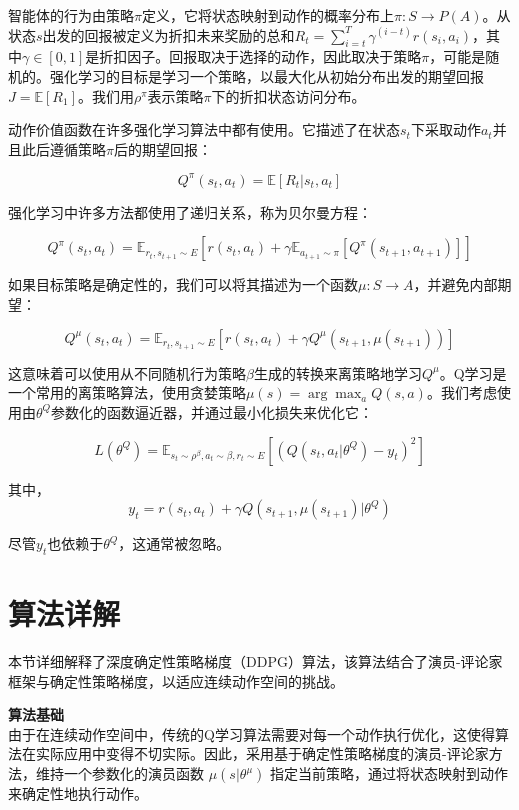 \documentclass[twocolumn, 10pt]{article} %
\theoremstyle{remark}
\begin{document}
智能体的行为由策略$\pi$定义，它将状态映射到动作的概率分布上$\pi : S \to P(A)$。从状态$s$出发的回报被定义为折扣未来奖励的总和$R_t = \sum_{i=t}^T \gamma^{(i-t)} r(s_i, a_i)$，其中$\gamma \in [0, 1]$是折扣因子。回报取决于选择的动作，因此取决于策略$\pi$，可能是随机的。强化学习的目标是学习一个策略，以最大化从初始分布出发的期望回报$J = \mathbb{E}[R_1]$。我们用$\rho^\pi$表示策略$\pi$下的折扣状态访问分布。

动作价值函数在许多强化学习算法中都有使用。它描述了在状态$s_t$下采取动作$a_t$并且此后遵循策略$\pi$后的期望回报：

\[
Q^\pi(s_t, a_t) = \mathbb{E}[R_t | s_t, a_t] 
\]

强化学习中许多方法都使用了递归关系，称为贝尔曼方程：

\[
Q^\pi(s_t, a_t) = \mathbb{E}_{r_t, s_{t+1} \sim E}\left[ r(s_t, a_t) + \gamma \mathbb{E}_{a_{t+1} \sim \pi} [Q^\pi(s_{t+1}, a_{t+1})] \right] 
\]

如果目标策略是确定性的，我们可以将其描述为一个函数$\mu : S \to A$，并避免内部期望：

\[
Q^\mu(s_t, a_t) = \mathbb{E}_{r_t, s_{t+1} \sim E} \left[ r(s_t, a_t) + \gamma Q^\mu(s_{t+1}, \mu(s_{t+1})) \right] 
\]

这意味着可以使用从不同随机行为策略$\beta$生成的转换来离策略地学习$Q^\mu$。Q学习是一个常用的离策略算法，使用贪婪策略$\mu(s) = \arg\max_a Q(s, a)$。我们考虑使用由$\theta^Q$参数化的函数逼近器，并通过最小化损失来优化它：

\[
L(\theta^Q) = \mathbb{E}_{s_t \sim \rho^\beta, a_t \sim \beta, r_t \sim E}\left[ \left( Q(s_t, a_t|\theta^Q) - y_t \right)^2 \right] 
\]

其中，
\[
y_t = r(s_t, a_t) + \gamma Q(s_{t+1}, \mu(s_{t+1})|\theta^Q)
\]

尽管$y_t$也依赖于$\theta^Q$，这通常被忽略。


\section{算法详解}

本节详细解释了深度确定性策略梯度（DDPG）算法，该算法结合了演员-评论家框架与确定性策略梯度，以适应连续动作空间的挑战。

\textbf{算法基础}\\
由于在连续动作空间中，传统的Q学习算法需要对每一个动作执行优化，这使得算法在实际应用中变得不切实际。因此，采用基于确定性策略梯度的演员-评论家方法，维持一个参数化的演员函数 $\mu(s|\theta^\mu)$ 指定当前策略，通过将状态映射到动作来确定性地执行动作。
\end{document}
